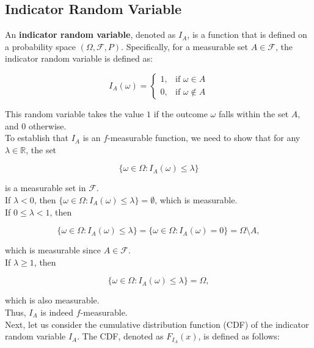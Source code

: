 \subsection{Indicator Random Variable}

An \textbf{indicator random variable}, denoted as \( I_A \), is a function that is defined on a probability space \((\Omega, \mathcal{F}, P)\). Specifically, for a measurable set \( A \in \mathcal{F} \), the indicator random variable is defined as:

\[
I_A(\omega) = 
\begin{cases}
1, & \text{if } \omega \in A \\
0, & \text{if } \omega \notin A
\end{cases}
\]

This random variable takes the value \(1\) if the outcome \( \omega \) falls within the set \( A \), and \(0\) otherwise. \\

To establish that \( I_A \) is an \( f \)-measurable function, we need to show that for any \( \lambda \in \mathbb{R} \), the set

\[
\{ \omega \in \Omega : I_A(\omega) \leq \lambda \}
\]

is a measurable set in \( \mathcal{F} \). \\

If \( \lambda < 0 \), then \( \{ \omega \in \Omega : I_A(\omega) \leq \lambda \} = \emptyset \), which is measurable. \\

If \( 0 \leq \lambda < 1 \), then 

\[
\{ \omega \in \Omega : I_A(\omega) \leq \lambda \} = \{ \omega \in \Omega : I_A(\omega) = 0 \} = \Omega \setminus A,
\]

which is measurable since \( A \in \mathcal{F} \).\\

If \( \lambda \geq 1 \), then 

\[
\{ \omega \in \Omega : I_A(\omega) \leq \lambda \} = \Omega,
\]

which is also measurable.\\

Thus, \( I_A \) is indeed \( f \)-measurable.\\

Next, let us consider the cumulative distribution function (CDF) of the indicator random variable \( I_A \). The CDF, denoted as \( F_{I_A}(x) \), is defined as follows:

